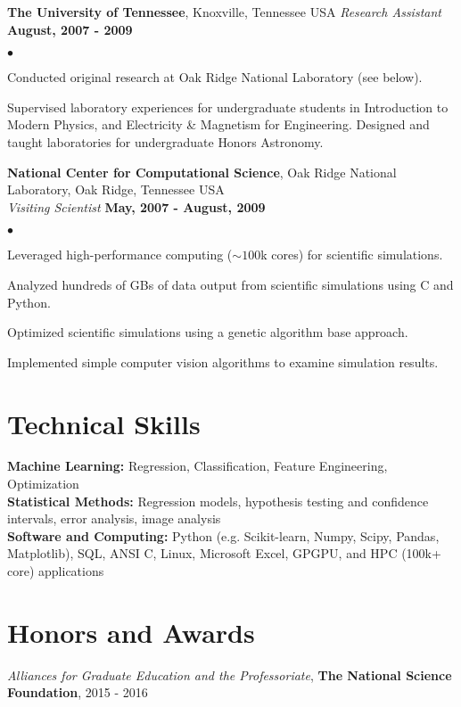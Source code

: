 \documentclass[margin,line, 11pt]{res}
\newenvironment{list2}{
  \begin{list}{$\bullet$}{%
      \setlength{\itemsep}{0in}
      \setlength{\parsep}{0in} \setlength{\parskip}{0in}
      \setlength{\topsep}{0in} \setlength{\partopsep}{0in} 
      \setlength{\leftmargin}{0.2in}}}{\end{list}}
\begin{document}
\begin{resume}
\textbf{The University of Tennessee}, Knoxville, Tennessee USA\newline
\textit{Research Assistant} \hfill \textbf{August, 2007 - 2009}\newline
    \begin{list2}
    	\vspace*{-5mm}
    	\item Conducted original research at Oak Ridge National Laboratory (see below).
    	\item Supervised laboratory experiences for undergraduate students in Introduction to Modern Physics, and Electricity \& Magnetism for Engineering. Designed and taught laboratories for undergraduate Honors Astronomy.
    \end{list2}
\vspace*{-5mm}

\textbf{National Center for Computational Science}, Oak Ridge National Laboratory, Oak Ridge, Tennessee USA\\
\textit{Visiting Scientist} \hfill \textbf{May, 2007 - August, 2009}\\
    \begin{list2}
    	\vspace*{-5mm}
    	\item Leveraged high-performance computing ($\sim 100$k cores) for scientific simulations.
    	\item Analyzed hundreds of GBs of data output from scientific simulations using C and Python.
    	\item Optimized scientific simulations using a genetic algorithm base approach.
    	\item Implemented simple computer vision algorithms to examine simulation results.
    \end{list2}

\section{Technical Skills}
\textbf{Machine Learning:} Regression, Classification, Feature Engineering, Optimization\\
\textbf{Statistical Methods:} Regression models, hypothesis testing and confidence intervals, error analysis, image analysis\\
\textbf{Software and Computing:}  Python (e.g. Scikit-learn, Numpy, Scipy, Pandas, Matplotlib), SQL, ANSI C, Linux, Microsoft Excel, GPGPU, and HPC (100k+ core) applications\\
\vspace*{-5mm}

\section{Honors and Awards}
\textit{Alliances for Graduate Education and the Professoriate}, \textbf{The National Science Foundation}, \hfill 2015 - 2016

\end{resume}
\end{document}
